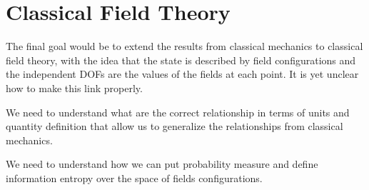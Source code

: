 \chapter{Classical Field Theory}

The final goal would be to extend the results from classical mechanics to classical field theory, with the idea that the state is described by field configurations and the independent DOFs are the values of the fields at each point. It is yet unclear how to make this link properly.

\ifdraft

\openproblembreak

{We need to understand what are the correct relationship in terms of units and quantity definition that allow us to generalize the relationships from classical mechanics.}

{We need to understand how we can put probability measure and define information entropy over the space of fields configurations.}

\fi